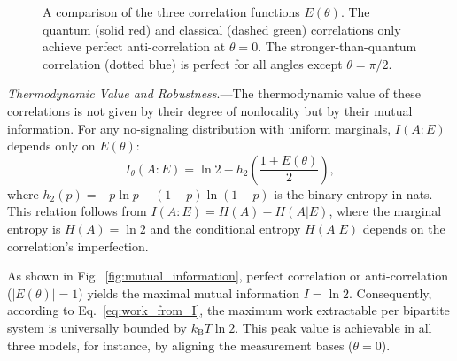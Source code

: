 \documentclass[%
  reprint,
  showpacs,
  showkeys,
  prl,
  floatfix
]{revtex4-2}
\begin{document}
\begin{figure}[ht!]
    \centering
{}
    \caption{A comparison of the three correlation functions $E(\theta)$. The quantum (solid red) and classical (dashed green) correlations only achieve perfect anti-correlation at $\theta=0$. The stronger-than-quantum correlation (dotted blue) is perfect for all angles except $\theta = \pi/2$.}
    \label{fig:correlations}
\end{figure}

\textit{Thermodynamic Value and Robustness}.---The thermodynamic value of these correlations is not given by their degree of nonlocality but by their mutual information. For any no-signaling distribution with uniform marginals, $I(A:E)$ depends only on $E(\theta)$:
\begin{equation}
I_\theta(A:E) = \ln 2 - h_2\left(\frac{1+E(\theta)}{2}\right),
\label{eq:Itheta}
\end{equation}
where $h_2(p)=-p\ln p-(1-p)\ln(1-p)$ is the binary entropy in nats. This relation follows from $I(A:E) = H(A) - H(A|E)$, where the marginal entropy is $H(A)=\ln 2$ and the conditional entropy $H(A|E)$ depends on the correlation's imperfection.

As shown in Fig.~\ref{fig:mutual_information}, perfect correlation or anti-correlation ($|E(\theta)|=1$) yields the maximal mutual information $I=\ln 2$. Consequently, according to Eq.~\eqref{eq:work_from_I}, the maximum work extractable per bipartite system is universally bounded by $k_{\mathrm{B}}T\ln 2$. This peak value is achievable in all three models, for instance, by aligning the measurement bases ($\theta=0$).
\end{document}
